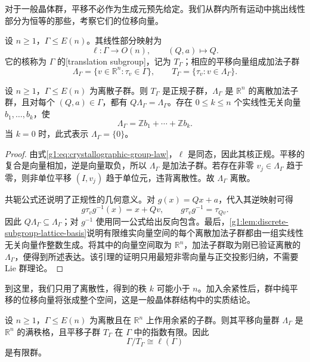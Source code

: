 对于一般晶体群，平移不必作为生成元预先给定。我们从群内所有运动中挑出线性部分为恒等的那些，考察它们的位移向量。

\begin{definition}
	\label{g1:def:translation-subgroup}
	设 \(n\ge1\)，\(\Gamma\le E(n)\)。其线性部分映射为
	\[
		\ell:\Gamma\longrightarrow O(n),\qquad (Q,a)\longmapsto Q.
	\]
	它的核称为 \(\Gamma\) 的[translation subgroup]，记为 \(T_\Gamma\)；相应的平移向量组成加法子群
	\[
		\Lambda_\Gamma=\{v\in\mathbb R^n:\tau_v\in\Gamma\},\qquad
		T_\Gamma=\{\tau_v:v\in\Lambda_\Gamma\}.
	\]
\end{definition}

\begin{proposition}
	\label{g1:prop:crystallographic-translation-kernel}
	设 \(n\ge1\)，\(\Gamma\le E(n)\) 为离散子群。则 \(T_\Gamma\) 是正规子群，\(\Lambda_\Gamma\) 是 \(\mathbb R^n\) 的离散加法子群，且对每个 \((Q,a)\in\Gamma\)，都有 \(Q\Lambda_\Gamma=\Lambda_\Gamma\)。存在 \(0\le k\le n\) 个实线性无关向量 \(b_1,\ldots,b_k\)，使
	\[
		\Lambda_\Gamma=\mathbb Zb_1+\cdots+\mathbb Zb_k.
	\]
	当 \(k=0\) 时，此式表示 \(\Lambda_\Gamma=\{0\}\)。
\end{proposition}
\begin{proof}
	由式\eqref{g1:eq:crystallographic-group-law}，\(\ell\) 是同态，因此其核正规。平移的复合是向量相加，逆是向量取负，所以 \(\Lambda_\Gamma\) 是加法子群。若存在非零 \(v_j\in\Lambda_\Gamma\) 趋于零，则非单位平移 \((I,v_j)\) 趋于单位元，违背离散性。故 \(\Lambda_\Gamma\) 离散。

	共轭公式还说明了正规性的几何意义。对 \(g(x)=Qx+a\)，代入其逆映射可得
	\begin{equation}\label{g1:eq:conjugate-translation}
		g\tau_vg^{-1}(x)=x+Qv,\qquad g\tau_vg^{-1}=\tau_{Qv}.
	\end{equation}
	因此 \(Q\Lambda_\Gamma\subseteq\Lambda_\Gamma\)；对 \(g^{-1}\) 使用同一公式给出反向包含。最后，\cref{g1:lem:discrete-subgroup-lattice-basis}说明有限维实向量空间的每个离散加法子群都由一组实线性无关向量作整数生成。将其中的向量空间取为 \(\mathbb R^n\)，加法子群取为刚已验证离散的 \(\Lambda_\Gamma\)，便得到所述表达。该引理的证明只用最短非零向量与正交投影归纳，不需要 Lie 群理论。
\end{proof}

到这里，我们只用了离散性，得到的秩 \(k\) 可能小于 \(n\)。加入余紧性后，群中纯平移的位移向量将张成整个空间，这是一般晶体群结构中的实质结论。

\begin{theorem}
	\label{g1:thm:bieberbach-translation-lattice}
	设 \(n\ge1\)，\(\Gamma\le E(n)\) 为离散且在 \(\mathbb R^n\) 上作用余紧的子群。则其平移向量群 \(\Lambda_\Gamma\) 是 \(\mathbb R^n\) 的满秩格，且平移子群 \(T_\Gamma\) 在 \(\Gamma\) 中的指数有限。因此
	\[
		\Gamma/T_\Gamma\cong\ell(\Gamma)
	\]
	是有限群。
\end{theorem}

